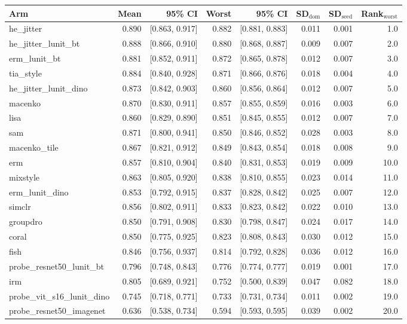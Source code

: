 \begin{tabular}{lrrrrrrr}
\toprule
Arm & Mean & 95\% CI & Worst & 95\% CI & SD$_\text{dom}$ & SD$_\text{seed}$ & Rank$_\text{worst}$ \\
\midrule
he\_jitter & 0.890 & [0.863, 0.917] & 0.882 & [0.881, 0.883] & 0.011 & 0.001 & 1.0 \\
he\_jitter\_lunit\_bt & 0.888 & [0.866, 0.910] & 0.880 & [0.868, 0.887] & 0.009 & 0.007 & 2.0 \\
erm\_lunit\_bt & 0.881 & [0.852, 0.911] & 0.872 & [0.865, 0.878] & 0.012 & 0.007 & 3.0 \\
tia\_style & 0.884 & [0.840, 0.928] & 0.871 & [0.866, 0.876] & 0.018 & 0.004 & 4.0 \\
he\_jitter\_lunit\_dino & 0.873 & [0.842, 0.903] & 0.860 & [0.856, 0.864] & 0.012 & 0.007 & 5.0 \\
macenko & 0.870 & [0.830, 0.911] & 0.857 & [0.855, 0.859] & 0.016 & 0.003 & 6.0 \\
lisa & 0.860 & [0.829, 0.890] & 0.851 & [0.845, 0.855] & 0.012 & 0.007 & 7.0 \\
sam & 0.871 & [0.800, 0.941] & 0.850 & [0.846, 0.852] & 0.028 & 0.003 & 8.0 \\
macenko\_tile & 0.867 & [0.821, 0.912] & 0.849 & [0.843, 0.854] & 0.018 & 0.008 & 9.0 \\
erm & 0.857 & [0.810, 0.904] & 0.840 & [0.831, 0.853] & 0.019 & 0.009 & 10.0 \\
mixstyle & 0.863 & [0.805, 0.920] & 0.838 & [0.810, 0.855] & 0.023 & 0.014 & 11.0 \\
erm\_lunit\_dino & 0.853 & [0.792, 0.915] & 0.837 & [0.828, 0.842] & 0.025 & 0.007 & 12.0 \\
simclr & 0.856 & [0.802, 0.911] & 0.833 & [0.823, 0.842] & 0.022 & 0.010 & 13.0 \\
groupdro & 0.850 & [0.791, 0.908] & 0.830 & [0.798, 0.847] & 0.024 & 0.017 & 14.0 \\
coral & 0.850 & [0.775, 0.925] & 0.823 & [0.808, 0.843] & 0.030 & 0.012 & 15.0 \\
fish & 0.846 & [0.756, 0.937] & 0.814 & [0.792, 0.828] & 0.036 & 0.012 & 16.0 \\
probe\_resnet50\_lunit\_bt & 0.796 & [0.748, 0.843] & 0.776 & [0.774, 0.777] & 0.019 & 0.001 & 17.0 \\
irm & 0.805 & [0.689, 0.921] & 0.752 & [0.500, 0.839] & 0.047 & 0.082 & 18.0 \\
probe\_vit\_s16\_lunit\_dino & 0.745 & [0.718, 0.771] & 0.733 & [0.731, 0.734] & 0.011 & 0.002 & 19.0 \\
probe\_resnet50\_imagenet & 0.636 & [0.538, 0.734] & 0.594 & [0.593, 0.595] & 0.039 & 0.002 & 20.0 \\
\bottomrule
\end{tabular}
